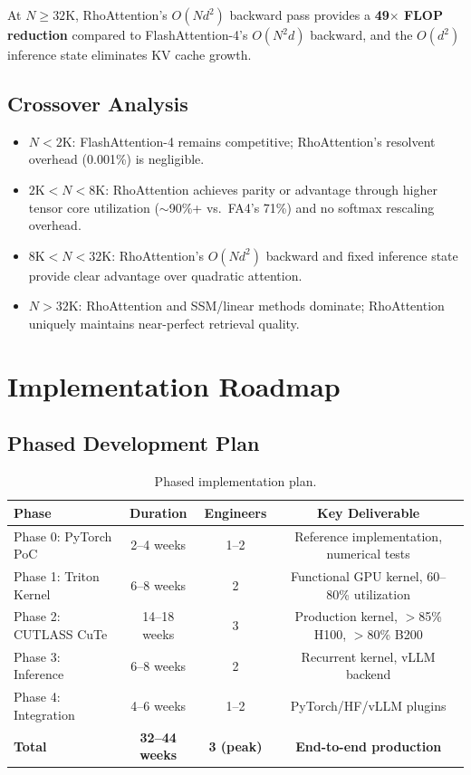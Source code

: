 \documentclass[11pt,a4paper]{article}
\theoremstyle{remark}
\begin{document}
At $N \geq 32\text{K}$, RhoAttention's $O(Nd^2)$ backward pass provides a \textbf{49$\times$ FLOP reduction} compared to FlashAttention-4's $O(N^2 d)$ backward, and the $O(d^2)$ inference state eliminates KV cache growth.

\subsection{Crossover Analysis}

\begin{itemize}
    \item \textbf{$N < 2\text{K}$}: FlashAttention-4 remains competitive; RhoAttention's resolvent overhead (0.001\%) is negligible.
    \item \textbf{$2\text{K} < N < 8\text{K}$}: RhoAttention achieves parity or advantage through higher tensor core utilization ($\sim$90\%+ vs.\ FA4's 71\%) and no softmax rescaling overhead.
    \item \textbf{$8\text{K} < N < 32\text{K}$}: RhoAttention's $O(Nd^2)$ backward and fixed inference state provide clear advantage over quadratic attention.
    \item \textbf{$N > 32\text{K}$}: RhoAttention and SSM/linear methods dominate; RhoAttention uniquely maintains near-perfect retrieval quality.
\end{itemize}

\section{Implementation Roadmap}
\label{sec:implementation}

\subsection{Phased Development Plan}

\begin{table}[h]
\centering
\caption{Phased implementation plan.}
\begin{tabular}{lccc}
\toprule
\textbf{Phase} & \textbf{Duration} & \textbf{Engineers} & \textbf{Key Deliverable} \\
\midrule
Phase 0: PyTorch PoC & 2--4 weeks & 1--2 & Reference implementation, numerical tests \\
Phase 1: Triton Kernel & 6--8 weeks & 2 & Functional GPU kernel, 60--80\% utilization \\
Phase 2: CUTLASS CuTe & 14--18 weeks & 3 & Production kernel, $>$85\% H100, $>$80\% B200 \\
Phase 3: Inference & 6--8 weeks & 2 & Recurrent kernel, vLLM backend \\
Phase 4: Integration & 4--6 weeks & 1--2 & PyTorch/HF/vLLM plugins \\
\midrule
\textbf{Total} & \textbf{32--44 weeks} & \textbf{3 (peak)} & \textbf{End-to-end production} \\
\bottomrule
\end{tabular}
\end{table}
\end{document}
